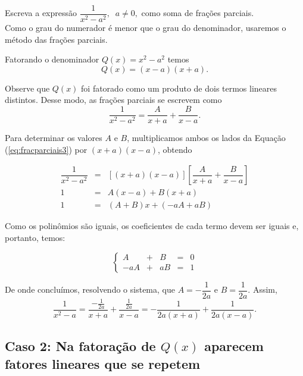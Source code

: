 \begin{exem}
    Escreva a expressão $\dfrac{1}{x^2 - a^2}, \; \; a \neq 0,$ como soma de frações parciais. \\[10pt]

    Como o grau do numerador é menor que o grau do denominador, usaremos o método das frações parciais.

    Fatorando o denominador $Q(x) = x^2 - a^2$ temos $$Q(x) = (x-a)(x + a).$$

    Observe que $Q(x)$ foi fatorado como um produto de dois termos lineares distintos. Desse modo, as frações parciais se escrevem como 
    \begin{equation}
    \label{eq:fracparciais3}
    \dfrac{1}{x^2 - a^2} = \dfrac{A}{x+a} + \dfrac{B}{x-a}.
    \end{equation}

    Para determinar os valores $A$ e $B$, multiplicamos ambos os lados da Equação (\ref{eq:fracparciais3}) por $(x+a)(x-a)$, obtendo

    \begin{eqnarray*}
    [(x+a)(x-a)]\dfrac{1}{x^2 -a^2} & = & [(x+a)(x-a)] \left[\dfrac{A}{x+a} + \dfrac{B}{x-a}\right]\\[5pt]
    1 & =& A(x-a) + B(x+a)\\[5pt]
    1 & =& (A + B)x + (-aA + aB)
    \end{eqnarray*}

    Como os polinômios são iguais, os coeficientes de cada termo devem ser iguais e, portanto, temos:

    \begin{equation*}
    \left\{ \begin{array}{ccccc} A & + & B &=& 0 \\[5pt]
    -aA & + & aB & =& 1
    \end{array}
    \right.    
    \end{equation*}

    De onde concluímos, resolvendo o sistema, que $A = -\dfrac{1}{2a}$ e $B = \dfrac{1}{2a}$. Assim, $$\dfrac{1}{x^2 - a} = \dfrac{-\frac{1}{2a}}{x+a} + \dfrac{\frac{1}{2a}}{x-a}  = -\dfrac{1}{2a(x+a)} +\dfrac{1}{2a(x-a)}.$$
\end{exem}

\subsection{Caso 2: Na fatoração de $Q(x)$ aparecem fatores lineares que se repetem}


